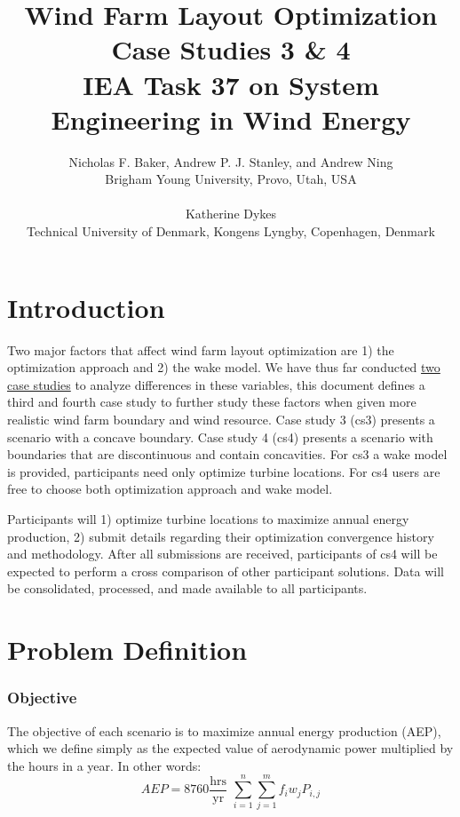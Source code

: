 \documentclass[10pt]{article}
\begin{document}
\title{Wind Farm Layout Optimization Case Studies 3 \& 4
\\
\small{IEA Task 37 on System Engineering in Wind Energy}
}
\author{\large Nicholas F. Baker, Andrew P. J. Stanley, and Andrew Ning \\
    {\small Brigham Young University, Provo, Utah, USA}\\
\vspace{-1em}\\
\large Katherine Dykes\\
    \small Technical University of Denmark, Kongens Lyngby, Copenhagen, Denmark}
\setlength{\droptitle}{-5em}
\maketitle

\section{Introduction}

    Two major factors that affect wind farm layout optimization are 1) the optimization approach and 2) the wake model.
    We have thus far conducted \href{https://github.com/byuflowlab/iea37-wflo-casestudies/tree/master/cs1-2}{two case studies} to analyze differences in these variables, this document defines a third and fourth case study to further study these factors when given more realistic wind farm boundary and wind resource.
    Case study 3 (cs3) presents a scenario with a concave boundary.
    Case study 4 (cs4) presents a scenario with boundaries that are discontinuous and contain concavities.
    For cs3 a wake model is provided, participants need only optimize turbine locations.
    For cs4 users are free to choose both optimization approach and wake model.

    Participants will 1) optimize turbine locations to maximize annual energy production, 2) submit details regarding their optimization convergence history and methodology.
    After all submissions are received, participants of cs4 will be expected to perform a cross comparison of other participant solutions.
    Data will be consolidated, processed, and made available to all participants.

\section{Problem Definition}

    \subsubsection*{Objective}
    \label{sec:Objective}
        The objective of each scenario is to maximize annual energy production (AEP), which we define simply as the expected value of aerodynamic power multiplied by the hours in a year.
        In other words:
        \begin{equation*}
            AEP = 8760 \frac{\textrm{hrs}}{\textrm{yr}} \,\, \sum_{i=1}^{n} \sum_{j=1}^{m} f_i w_j P_{i,j}
        \end{equation*}
        
\end{document}
